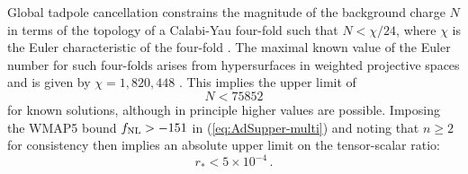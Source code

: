 Global tadpole cancellation constrains the magnitude of
the background charge $N$ in terms of the topology of 
a Calabi-Yau four-fold such that $N < \chi /
24$, where $\chi$ is the Euler characteristic of the four-fold
\cite{witten1,witten2,witten3,sethi,gkp,klemm}. 
The  maximal known value of the Euler number for such four-folds arises from 
hypersurfaces in weighted projective spaces and is given by 
$\chi = 1, 820,448$ \cite{klemm}. This implies the upper limit of 
% 
\begin{equation}
\label{eq:Nlimit-multi} 
N < 75852
\end{equation}
% 
for known solutions, although in principle higher values are possible. 
Imposing the WMAP5 bound $f_{\mathrm{NL}}>-151$ in (\ref{eq:AdSupper-multi})
and noting that $n \ge 2$ for consistency then implies an absolute
upper limit 
on the tensor-scalar ratio:
%  
\begin{equation}
\label{eq:rupper-multi}
r_* < 5 \times 10^{-4} \, .
\end{equation}
% 


